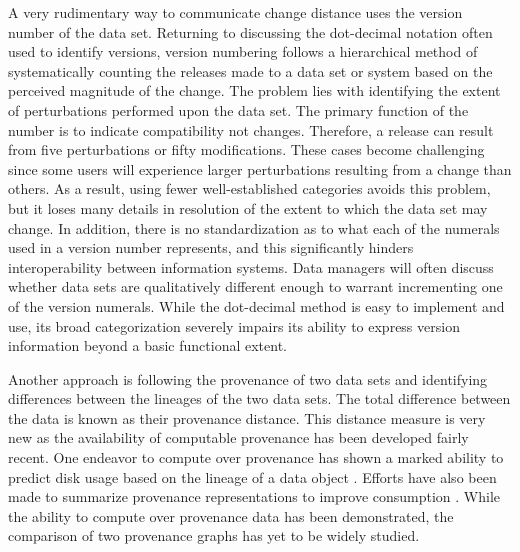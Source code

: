 A very rudimentary way to communicate change distance uses the version number of the data set.
Returning to discussing the dot-decimal notation often used to identify versions, version numbering follows a hierarchical method of systematically counting the releases made to a data set or system based on the perceived magnitude of the change.
The problem lies with identifying the extent of perturbations performed upon the data set.
The primary function of the number is to indicate compatibility not changes.
Therefore, a release can result from five perturbations or fifty modifications.
These cases become challenging since some users will experience larger perturbations resulting from a change than others.
As a result, using fewer well-established categories avoids this problem, but it loses many details in resolution of the extent to which the data set may change.
In addition, there is no standardization as to what each of the numerals used in a version number represents, and this significantly hinders interoperability between information systems.
Data managers will often discuss whether data sets are qualitatively different enough to warrant incrementing one of the version numerals.
While the dot-decimal method is easy to implement and use, its broad categorization severely impairs its ability to express version information beyond a basic functional extent.

Another approach is following the provenance of two data sets and identifying  differences between the lineages of the two data sets.
The total difference between the data is known as their provenance distance.
This distance measure is very new as the availability of computable provenance has been developed fairly recent.
One endeavor to compute over provenance has shown a marked ability to predict disk usage based on the lineage of a data object \cite{dai2014provenance}.
Efforts have also been made to summarize provenance representations to improve consumption \cite{Ainy:2015:ASD:2806416.2806429}.
While the ability to compute over provenance data has been demonstrated, the comparison of two provenance graphs has yet to be widely studied.

